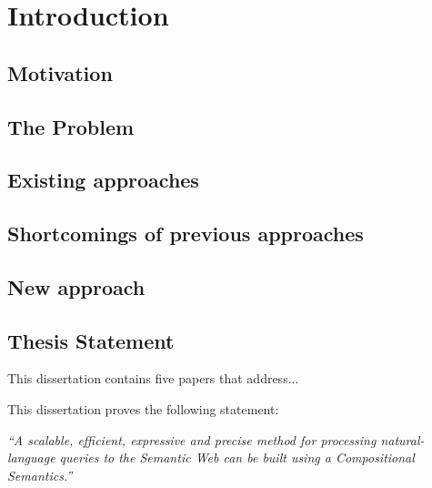 \documentclass[../main.tex]{subfiles}
\begin{document}
\chapter{Introduction}
\begin{refsection}

\label{chapter:intro}


\section{Motivation}



\section {The Problem}




\section {Existing approaches}



\section {Shortcomings of previous approaches}


\section {New approach}


\section{Thesis Statement}

This dissertation contains five papers that address...

This dissertation proves the following statement:

\textit{``A scalable, efficient, expressive and precise method for processing natural-language queries to the Semantic Web can be built using a Compositional Semantics.''}


\end{refsection}
\end{document}
